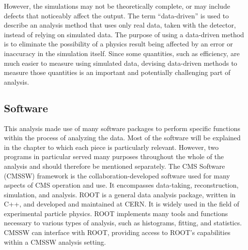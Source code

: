 However, the simulations may not be theoretically complete, 
or may include 
defects %
that noticeably affect the output.  
The term ``data-driven'' is used to describe an analysis method 
that uses only real data, taken with the detector, 
instead of relying on simulated data.  
The purpose of using a data-driven method is to 
eliminate the possibility of a physics result 
being affected by an error or inaccuracy 
in the simulation itself.  
Since some quantities, such as efficiency, 
are much easier to measure using simulated data, 
devising data-driven methods to measure those quantities 
is an important and potentially challenging 
part of analysis.  

\subsection{Software}
\label{over:software}



This analysis made use of many software packages 
to perform specific functions within 
the process of analyzing the data.  
Most of the software will be explained 
in the chapter to which each piece is particularly 
relevant.  
However, two programs in particular 
served many purposes 
throughout the whole of the analysis and 
should therefore be mentioned separately.  
%
The CMS Software (CMSSW) framework 
\cite{cmssw}
is the collaboration-developed software 
used for many aspects of CMS operation and use.  
It encompasses data-taking, reconstruction, 
simulation, and analysis.  
%
ROOT \cite{root} 
is a general data analysis package, 
written in C++, 
and developed and maintained at CERN. 
It is widely used in the field of 
experimental particle physics.  
ROOT implements many tools and functions 
necessary to various types of analysis, 
such as histograms, fitting, 
and statistics.  
CMSSW can interface with ROOT, 
providing access to ROOT's %
capabilities within a CMSSW 
analysis setting.  

